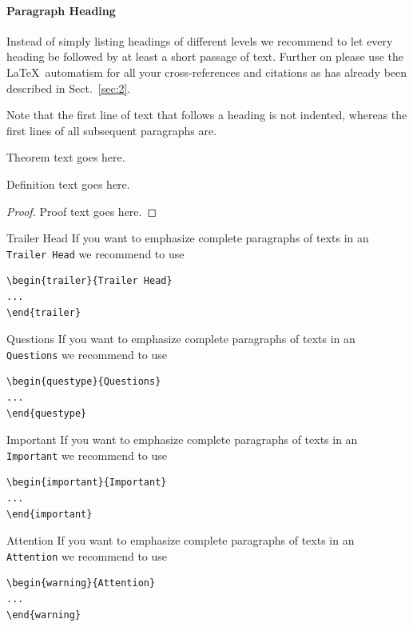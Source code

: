 \paragraph{Paragraph Heading} %
Instead of simply listing headings of different levels we recommend to let every heading be followed by at least a short passage of text.  Further on please use the \LaTeX\ automatism for all your cross-references and citations as has already been described in Sect.~\ref{sec:2}.

Note that the first line of text that follows a heading is not indented, whereas the first lines of all subsequent paragraphs are.
%
%
\begin{theorem}
Theorem text goes here.
\end{theorem}
%
\begin{definition}
Definition text goes here.
\end{definition}
%
\begin{proof}
Proof text goes here.
\end{proof}
%
\begin{trailer}{Trailer Head}
If you want to emphasize complete paragraphs of texts in an \verb|Trailer Head| we recommend to
use  \begin{verbatim}\begin{trailer}{Trailer Head}
...
\end{trailer}\end{verbatim}
\end{trailer}
%
\begin{questype}{Questions}
If you want to emphasize complete paragraphs of texts in an \verb|Questions| we recommend to
use  \begin{verbatim}\begin{questype}{Questions}
...
\end{questype}\end{verbatim}
\end{questype}
\eject%
\begin{important}{Important}
If you want to emphasize complete paragraphs of texts in an \verb|Important| we recommend to
use  \begin{verbatim}\begin{important}{Important}
...
\end{important}\end{verbatim}
\end{important}
%
\begin{warning}{Attention}
If you want to emphasize complete paragraphs of texts in an \verb|Attention| we recommend to
use  \begin{verbatim}\begin{warning}{Attention}
...
\end{warning}\end{verbatim}
\end{warning}

